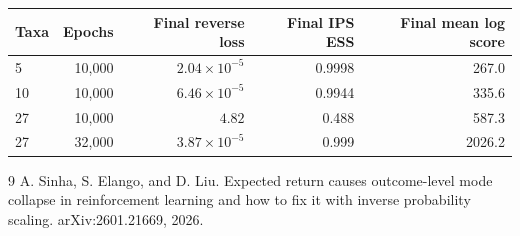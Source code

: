 \documentclass[11pt]{article}
\begin{document}
\begin{center}
\begin{tabular}{lrrrr}
\toprule
Taxa & Epochs & Final reverse loss & Final IPS ESS & Final mean log score \\
\midrule
5  & 10{,}000 & $2.04\times10^{-5}$ & 0.9998 & 267.0 \\
10 & 10{,}000 & $6.46\times10^{-5}$ & 0.9944 & 335.6 \\
27 & 10{,}000 & $4.82$              & 0.488  & 587.3 \\
27 & 32{,}000 & $3.87\times10^{-5}$ & 0.999  & 2026.2 \\
\bottomrule
\end{tabular}
\end{center}

\FloatBarrier


\begin{thebibliography}{9}
A. Sinha, S. Elango, and D. Liu.
\newblock Expected return causes outcome-level mode collapse in reinforcement
learning and how to fix it with inverse probability scaling.
\newblock arXiv:2601.21669, 2026.
\end{thebibliography}
\end{document}
